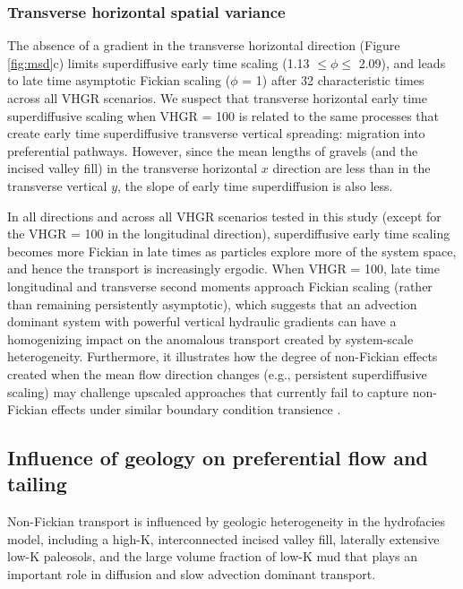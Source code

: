 \subsubsection{Transverse horizontal spatial variance}
\label{ss_3_2c}
The absence of a gradient in the transverse horizontal direction (Figure \ref{fig:msd}c) limits superdiffusive early time scaling (1.13 $\leq \phi \leq$ 2.09), and leads to late time asymptotic Fickian scaling ($\phi$ = 1) after 32 characteristic times across all VHGR scenarios. We suspect that transverse horizontal early time superdiffusive scaling when VHGR = 100 is related to the same processes that create early time superdiffusive transverse vertical spreading: migration into preferential pathways. However, since the mean lengths of gravels (and the incised valley fill) in the transverse horizontal $x$ direction are less than in the transverse vertical $y$, the slope of early time superdiffusion is also less.  

In all directions and across all VHGR scenarios tested in this study (except for the VHGR = 100 in the longitudinal direction), superdiffusive early time scaling becomes more Fickian in late times as particles explore more of the system space, and hence the transport is increasingly ergodic. When VHGR = 100, late time longitudinal and transverse second moments approach Fickian scaling (rather than remaining persistently asymptotic), which suggests that an advection dominant system with powerful vertical hydraulic gradients can have a homogenizing impact on the anomalous transport created by system-scale heterogeneity. Furthermore, it illustrates how the degree of non-Fickian effects created when the mean flow direction changes (e.g., persistent superdiffusive scaling) may challenge upscaled approaches that currently fail to capture non-Fickian effects under similar boundary condition transience \citep{guo2020adaptive}.



%
%
\subsection{Influence of geology on preferential flow and tailing}
\label{ss_3_4}

Non-Fickian transport is influenced by geologic heterogeneity in the hydrofacies model, including a high-K, interconnected incised valley fill, laterally extensive low-K paleosols, and the large volume fraction of low-K mud that plays an important role in diffusion and slow advection dominant transport.

